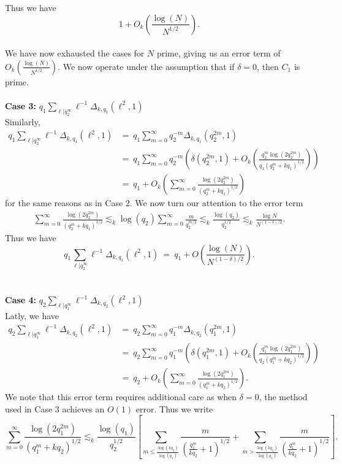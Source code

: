 \documentclass[11pt, reqno]{amsart}
\theoremstyle{definition}
\theoremstyle{remark}
\numberwithin{equation}{section}
\begin{document}
Thus we have $$1+O_k\left(\frac{\log(N)}{N^{1/2}} \right).$$\\
We have now exhausted the cases for $N$ prime, giving us an error term of $O_k\left( \frac{\log(N)}{N^{1/2}}\right).$ We now operate under the assumption that if $\delta=0$, then $C_1$ is prime.\\
\\
\textbf{Case 3:} $q_1\sum_{\ell|q_2^{\infty}}\ell^{-1}\Delta_{k,q_1}(\ell^2,1)$\\
Similarly, 
\begin{align*}
q_1\sum_{\ell|q_2^{\infty}}\ell^{-1}\Delta_{k,q_1}(\ell^2,1)&= \ q_1\sum_{m=0}^{\infty}q_2^{-m}\Delta_{k,q_1}(q_2^{2m},1)\\
    &= \ q_1\sum_{m=0}^{\infty}q_2^{-m}\left(\delta(q_2^{2m},1)+O_k\left( \frac{q_2^{m}\log(2q_2^{2m})}{q_1(q_2^{m}+kq_1)^{1/2}} \right) \right) \\
    &= \ q_1+O_k\left(\sum_{m=0}^{\infty} \frac{\log(2q_2^{2m})}{(q_2^{m}+kq_1)^{1/2}} \right)
\end{align*}
for the same reasons as in Case 2. We now turn our attention to the error term
\begin{align*}
    \sum_{m=0}^{\infty} \frac{\log(2q_2^{2m})}{(q_2^{m}+kq_1)^{1/2}} \lesssim_k \log(q_2)\sum_{m=0}^{\infty} \frac{m}{q_2^{m/2}}
    \lesssim_k\frac{\log(q_2)}{q_2^{1/2}}\lesssim_k\frac{\log   N}{N^{(1-\delta)/2}}.
\end{align*}
Thus we have
$$q_1\sum_{\ell|q_2^{\infty}}\ell^{-1}\Delta_{k,q_1}(\ell^2,1)\ =\ q_1+O\left(\frac{\log(N)}{N^{(1-\delta)/2}}\right).$$\\ 
\\
\textbf{Case 4:} 
$q_2\sum_{\ell|q_1^{\infty}}\ell^{-1}\Delta_{k,q_2}(\ell^2,1)$\\ 
Latly, we have
\begin{align*}
    q_2\sum_{\ell|q_1^{\infty}}\ell^{-1}\Delta_{k,q_2}(\ell^2,1)&=\ q_2\sum_{m=0}^{\infty}q_1^{-m}\Delta_{k,q_2}(q_1^{2m},1)\\
    &=\ q_2\sum_{m=0}^{\infty}q_1^{-m}\left(\delta(q_1^{2m},1)+O_k\left( \frac{q_1^{m}\log(2q_1^{2m})}{q_2(q_1^{m}+kq_2)^{1/2}} \right) \right) \\
    &=\ q_2+O_k\left(\sum_{m=0}^{\infty} \frac{\log(2q_1^{2m})}{(q_1^{m}+kq_2)^{1/2}} \right).
\end{align*}
We note that this error term requires additional care as when $\delta=0$, the method used in Case 3 achieves an $O(1)$ error. Thus we write
$$\sum_{m=0}^{\infty} \frac{\log(2q_1^{2m})}{(q_1^{m}+kq_2)^{1/2}}\lesssim_k\frac{\log(q_1)}{q_2^{1/2}}\left[\sum_{m\leq \frac{\log(kq_2)}{\log(q_1)}} \frac{m}{(\frac{q_1^{m}}{kq_2}+1)^{1/2}}+\sum_{m> \frac{\log(kq_2)}{\log(q_1)}} \frac{m}{(\frac{q_1^{m}}{kq_2}+1)^{1/2}} \right].$$
\end{document}
